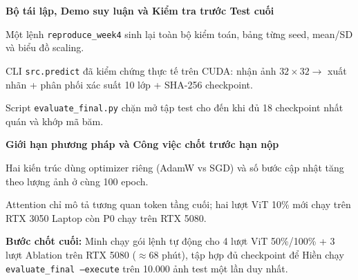 \documentclass{article}
\newcommand{\slide}[1]{\clearpage\color{navy}\fontsize{28}{33}\selectfont\textbf{#1}\par\color{black}\fontsize{18.5}{24}\selectfont}
\begin{document}
\slide{Bộ tái lập, Demo suy luận và Kiểm tra trước Test cuối}
Một lệnh \texttt{reproduce\_week4} sinh lại toàn bộ kiểm toán, bảng từng seed, mean/SD và biểu đồ scaling.

CLI \texttt{src.predict} đã kiểm chứng thực tế trên CUDA: nhận ảnh $32\times32 \rightarrow$ xuất nhãn + phân phối xác suất 10 lớp + SHA-256 checkpoint.

Script \texttt{evaluate\_final.py} chặn mở tập test cho đến khi đủ 18 checkpoint nhất quán và khớp mã băm.

\slide{Giới hạn phương pháp và Công việc chốt trước hạn nộp}
Hai kiến trúc dùng optimizer riêng (AdamW vs SGD) và số bước cập nhật tăng theo lượng ảnh ở cùng 100 epoch.

Attention chỉ mô tả tương quan token tầng cuối; hai lượt ViT 10\% mới chạy trên RTX 3050 Laptop còn P0 chạy trên RTX 5080.

\textbf{Bước chốt cuối:} Minh chạy gói lệnh tự động cho 4 lượt ViT 50\%/100\% + 3 lượt Ablation trên RTX 5080 ($\approx 68$ phút), tập hợp đủ checkpoint để Hiền chạy \texttt{evaluate\_final --execute} trên 10.000 ảnh test một lần duy nhất.
\end{document}
